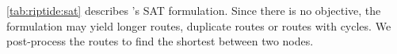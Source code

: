 \begin{table*}[h]
\caption{\riptide's SAT formulation.}
\label{tab:riptide:sat}
\end{table*}

\autoref{tab:riptide:sat} describes \riptide's SAT formulation.
% 
Since there is no objective, the formulation may yield longer routes, duplicate routes or routes with cycles.
% 
We post-process the routes to find the shortest between two nodes.

